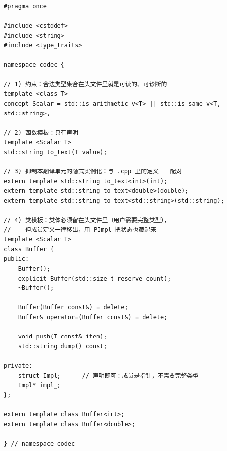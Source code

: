 \documentclass[12pt,a4paper,fontset=fandol]{ctexbook}
\begin{document}
\begin{lstlisting}[style=cppstyle,caption={text\_codec.hpp —— 对外只有约束、声明与 extern template}]
#pragma once

#include <cstddef>
#include <string>
#include <type_traits>

namespace codec {

// 1) 约束：合法类型集合在头文件里就是可读的、可诊断的
template <class T>
concept Scalar = std::is_arithmetic_v<T> || std::is_same_v<T, std::string>;

// 2) 函数模板：只有声明
template <Scalar T>
std::string to_text(T value);

// 3) 抑制本翻译单元的隐式实例化：与 .cpp 里的定义一一配对
extern template std::string to_text<int>(int);
extern template std::string to_text<double>(double);
extern template std::string to_text<std::string>(std::string);

// 4) 类模板：类体必须留在头文件里（用户需要完整类型），
//    但成员定义一律移出，用 PImpl 把状态也藏起来
template <Scalar T>
class Buffer {
public:
    Buffer();
    explicit Buffer(std::size_t reserve_count);
    ~Buffer();

    Buffer(Buffer const&) = delete;
    Buffer& operator=(Buffer const&) = delete;

    void push(T const& item);
    std::string dump() const;

private:
    struct Impl;      // 声明即可：成员是指针，不需要完整类型
    Impl* impl_;
};

extern template class Buffer<int>;
extern template class Buffer<double>;

} // namespace codec
\end{lstlisting}
\end{document}
